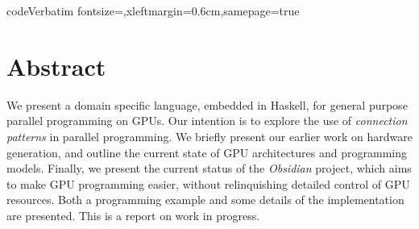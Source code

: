 





   \DefineVerbatimEnvironment
     {code}{Verbatim}
     {fontsize=\small,xleftmargin=0.6cm,samepage=true}

%


       



\section*{Abstract}

We present a domain specific language, embedded in Haskell, for general
purpose parallel programming on GPUs. Our intention is to explore the use of
{\em connection patterns} in parallel programming. We briefly present our
earlier work on hardware generation, and outline the current state of GPU
architectures and programming models. Finally, we present the current status
of the {\em Obsidian} project, which aims to make GPU programming easier,
without relinquishing detailed control of GPU resources. Both a programming
example and some details of the implementation are presented. This is a
report on work in progress.








%
%

%
